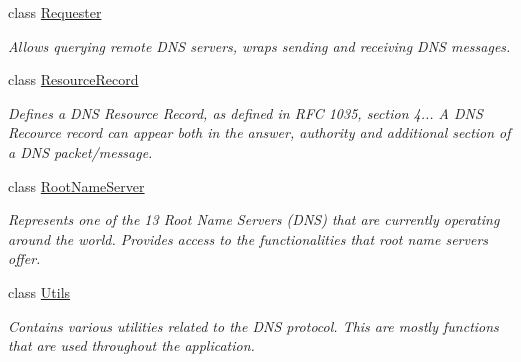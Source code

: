 \begin{DoxyCompactItemize}
class \hyperlink{class_senergy_1_1_dns_1_1_requester}{Requester}
\begin{DoxyCompactList}\small\item\em Allows querying remote D\-N\-S servers, wraps sending and receiving D\-N\-S messages. \end{DoxyCompactList}\item 
class \hyperlink{class_senergy_1_1_dns_1_1_resource_record}{Resource\-Record}
\begin{DoxyCompactList}\small\item\em Defines a D\-N\-S Resource Record, as defined in R\-F\-C 1035, section 4... A D\-N\-S Recource record can appear both in the answer, authority and additional section of a D\-N\-S packet/message. \end{DoxyCompactList}\item 
class \hyperlink{class_senergy_1_1_dns_1_1_root_name_server}{Root\-Name\-Server}
\begin{DoxyCompactList}\small\item\em Represents one of the 13 Root Name Servers (D\-N\-S) that are currently operating around the world. Provides access to the functionalities that root name servers offer. \end{DoxyCompactList}\item 
class \hyperlink{class_senergy_1_1_dns_1_1_utils}{Utils}
\begin{DoxyCompactList}\small\item\em Contains various utilities related to the D\-N\-S protocol. This are mostly functions that are used throughout the application. \end{DoxyCompactList}\end{DoxyCompactItemize}
